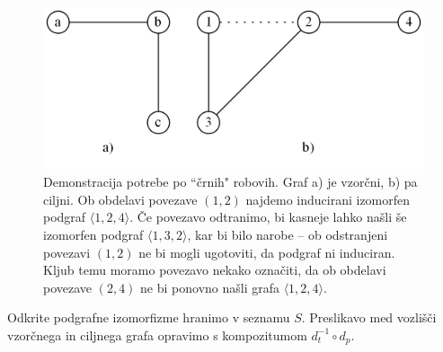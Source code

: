 \documentclass[a4paper, 12pt, ]{book}
\begin{document}
	\begin{figure}
	\begin{center}
	\includegraphics[width=12cm]{img/graph_subsea_black.png}
	\end{center}
	\caption{Demonstracija potrebe po ``črnih" robovih. Graf a) je vzorčni, b) pa ciljni. Ob obdelavi povezave $(1,2)$ najdemo inducirani izomorfen podgraf
	$\langle 1, 2, 4\rangle$. Če povezavo odtranimo, bi kasneje lahko našli še izomorfen podgraf $\langle 1, 3, 2 \rangle$, kar bi bilo narobe -- ob 
	odstranjeni povezavi $(1,2)$ ne bi mogli ugotoviti, da podgraf ni induciran. Kljub temu moramo povezavo nekako označiti, da ob obdelavi povezave 
	$(2,4)$ ne bi ponovno našli grafa $\langle 1, 2, 4\rangle$.}
	\label{pic_subsea_black}
	\end{figure}
	
	Odkrite podgrafne izomorfizme hranimo v seznamu $S$. Preslikavo med vozlišči vzorčnega in ciljnega grafa opravimo s kompozitumom 
	$d_t^{-1}\circ d_p$.
	
\end{document}
